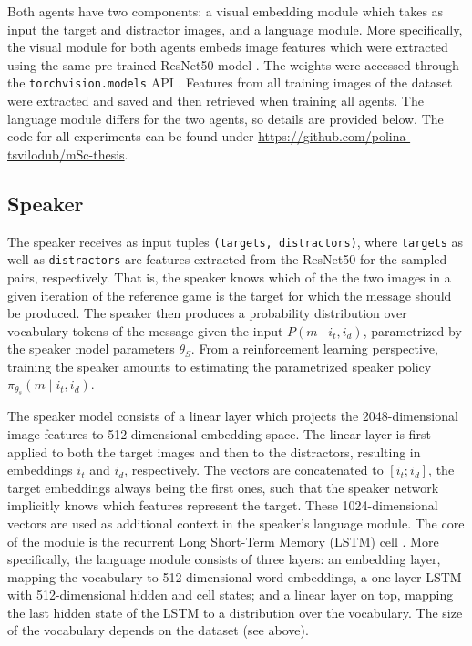 Both agents have two components: a visual embedding module which takes as input the target and distractor images, and a language module. More specifically, the visual module for both agents embeds image features which were extracted using the same pre-trained ResNet50 model \parencite{he2016deep}. The weights were accessed through the \texttt{torchvision.models} API \parencite{marcel2010torchvision}. Features from all training images of the dataset were extracted and saved and then retrieved when training all agents. 
The language module differs for the two agents, so details are provided below. 
The code for all experiments can be found under \url{https://github.com/polina-tsvilodub/mSc-thesis}. 

\subsection{Speaker}
The speaker receives as input tuples \texttt{(targets, distractors)}, where \texttt{targets} as well as \texttt{distractors} are features extracted from the ResNet50 for the sampled pairs, respectively. That is, the speaker knows which of the the two images in a given iteration of the reference game is the target for which the message should be produced. The speaker then produces a probability distribution over vocabulary tokens of the message given the input $P(m \mid i_t, i_d)$, parametrized by the speaker model parameters $\theta_S$. From a reinforcement learning perspective, training the speaker amounts to estimating the parametrized speaker policy $\pi_{\theta_s}(m \mid i_t, i_d)$.

The speaker model consists of a linear layer which projects the 2048-dimensional image features to 512-dimensional embedding space. The linear layer is first applied to both the target images and then to the distractors, resulting in embeddings $i_t$ and $i_d$, respectively. The vectors are concatenated to $[i_t; i_d]$, the target embeddings always being the first ones, such that the speaker network implicitly knows which features represent the target. These 1024-dimensional vectors are used as additional context in the speaker's language module. The core of the module is the recurrent Long Short-Term Memory (LSTM) cell \parencite{hochreiter1997long}. More specifically, the language module consists of three layers: an embedding layer, mapping the vocabulary to 512-dimensional word embeddings, a one-layer LSTM with 512-dimensional hidden and cell states; and a linear layer on top, mapping the last hidden state of the LSTM to a distribution over the vocabulary. The size of the vocabulary depends on the dataset (see above).


